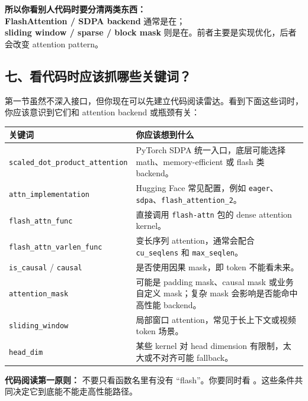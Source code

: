 \begin{warnbox}
\textbf{所以你看别人代码时要分清两类东西：}\\
\textbf{FlashAttention / SDPA backend} 通常是在；\\
\textbf{sliding window / sparse / block mask} 则是在。前者主要是实现优化，后者会改变 attention pattern。
\end{warnbox}

\subsection{七、看代码时应该抓哪些关键词？}

第一节虽然不深入接口，但你现在可以先建立代码阅读雷达。看到下面这些词时，你应该意识到它们和 attention backend 或瓶颈有关：

\begin{center}
{\small
\begin{tabular}{p{4.2cm}p{8.6cm}}
\hline
\textbf{关键词} & \textbf{你应该想到什么} \\
\hline
\texttt{scaled\_dot\_product\_attention} & PyTorch SDPA 统一入口，底层可能选择 math、memory-efficient 或 flash 类 backend。 \\
\texttt{attn\_implementation} & Hugging Face 常见配置，例如 \texttt{eager}、\texttt{sdpa}、\texttt{flash\_attention\_2}。 \\
\texttt{flash\_attn\_func} & 直接调用 \texttt{flash-attn} 包的 dense attention kernel。 \\
\texttt{flash\_attn\_varlen\_func} & 变长序列 attention，通常会配合 \texttt{cu\_seqlens} 和 \texttt{max\_seqlen}。 \\
\texttt{is\_causal} / \texttt{causal} & 是否使用因果 mask，即 token 不能看未来。 \\
\texttt{attention\_mask} & 可能是 padding mask、causal mask 或业务自定义 mask；复杂 mask 会影响是否能命中高性能 backend。 \\
\texttt{sliding\_window} & 局部窗口 attention，常见于长上下文或视频 token 场景。 \\
\texttt{head\_dim} & 某些 kernel 对 head dimension 有限制，太大或不对齐可能 fallback。 \\
\hline
\end{tabular}
}
\end{center}

\begin{summarybox}
\textbf{代码阅读第一原则：} 不要只看函数名里有没有 “flash”。你要同时看 。这些条件共同决定它到底能不能走高性能路径。
\end{summarybox}

